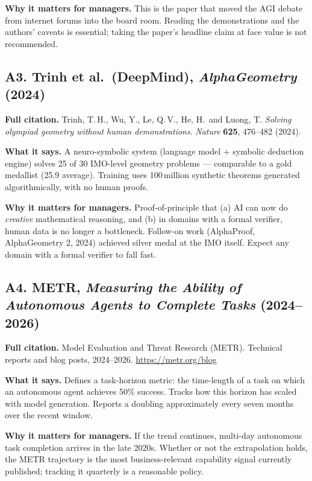 \documentclass[11pt,a4paper]{article}
\begin{document}
\textbf{Why it matters for managers.}
This is the paper that moved the AGI debate from internet forums into
the board room. Reading the demonstrations and the authors' caveats
is essential; taking the paper's headline claim at face value is not
recommended.

\subsection*{A3. Trinh et al.\ (DeepMind), \emph{AlphaGeometry} (2024)}

\textbf{Full citation.}
Trinh, T.\,H., Wu, Y., Le, Q.\,V., He, H.\ and Luong, T.
\emph{Solving olympiad geometry without human demonstrations}.
\emph{Nature} \textbf{625}, 476--482 (2024).

\textbf{What it says.}
A neuro-symbolic system (language model + symbolic deduction engine)
solves 25 of 30 IMO-level geometry problems --- comparable to a gold
medallist (25.9 average). Training uses 100\,million synthetic theorems
generated algorithmically, with no human proofs.

\textbf{Why it matters for managers.}
Proof-of-principle that (a) AI can now do \emph{creative} mathematical
reasoning, and (b) in domains with a formal verifier, human data is no
longer a bottleneck. Follow-on work (AlphaProof, AlphaGeometry 2, 2024)
achieved silver medal at the IMO itself. Expect any domain with a formal
verifier to fall fast.

\subsection*{A4. METR, \emph{Measuring the Ability of Autonomous Agents to
Complete Tasks} (2024--2026)}

\textbf{Full citation.}
Model Evaluation and Threat Research (METR). Technical reports and
blog posts, 2024--2026. \url{https://metr.org/blog}

\textbf{What it says.}
Defines a task-horizon metric: the time-length of a task on which an
autonomous agent achieves 50\% success. Tracks how this horizon has
scaled with model generation. Reports a doubling approximately every
seven months over the recent window.

\textbf{Why it matters for managers.}
If the trend continues, multi-day autonomous task completion arrives
in the late 2020s. Whether or not the extrapolation holds, the METR
trajectory is the most business-relevant capability signal currently
published; tracking it quarterly is a reasonable policy.
\end{document}
